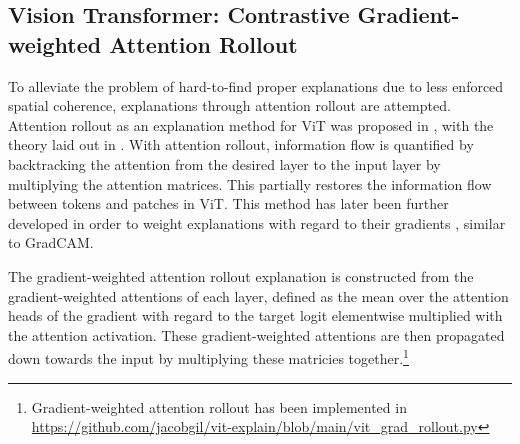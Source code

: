 




\subsection{Vision Transformer: Contrastive Gradient-weighted Attention Rollout} \label{sec:gradient-weighted-attention-rollout}

To alleviate the problem of hard-to-find proper explanations due to less enforced spatial coherence, explanations through attention rollout are attempted. Attention rollout as an explanation method for ViT was proposed in \citet{visual-transformer}, with the theory laid out in \citet{Quantifying-Attention-Flow}. With attention rollout, information flow is quantified by backtracking the attention from the desired layer to the input layer by multiplying the attention matrices. This partially restores the information flow between tokens and patches in ViT. %
This method has later been further developed in order to weight explanations with regard to their gradients \citep{blog-grad-rollout, Chefer2020Dec}, similar to GradCAM.

The gradient-weighted attention rollout explanation is constructed from the gradient-weighted attentions of each layer, defined as the mean over the attention heads of the gradient with regard to the target logit elementwise multiplied with the attention activation. These gradient-weighted attentions are then propagated down towards the input by multiplying these matricies together.\footnote{Gradient-weighted attention rollout has been implemented in \url{https://github.com/jacobgil/vit-explain/blob/main/vit_grad_rollout.py}}

